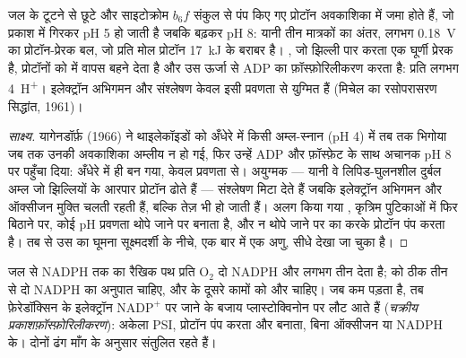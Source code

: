 \begin{theorem}\label{thm:b1:photosynthesis:chemiosmosis}
जल के टूटने से छूटे और साइटोक्रोम $b_6f$ संकुल से पंप किए गए प्रोटॉन
 अवकाशिका में जमा होते हैं, जो प्रकाश में गिरकर pH 5 हो जाती है
जबकि  बढ़कर pH 8: यानी तीन मात्रकों का अंतर, लगभग \qty{0.18}{V} का
प्रोटॉन-प्रेरक बल, जो प्रति मोल प्रोटॉन \qty{17}{kJ} के बराबर है।
\emph{}, जो  झिल्ली पार करता एक घूर्णी प्रेरक है,
प्रोटॉनों को  में वापस बहने देता है और उस ऊर्जा से ADP का
फ़ॉस्फ़ोरिलीकरण करता है: प्रति  लगभग \qty{4}{H^+}। इलेक्ट्रॉन अभिगमन
और  संश्लेषण केवल इसी प्रवणता से युग्मित हैं (मिचेल का रसोपरासरण
सिद्धांत, 1961)।
\end{theorem}
\begin{proof}[साक्ष्य]
यागेनडॉर्फ़ (1966) ने थाइलेकॉइडों को अँधेरे में किसी अम्ल-स्नान (pH 4) में
तब तक भिगोया जब तक उनकी अवकाशिका अम्लीय न हो गई, फिर उन्हें ADP और
फ़ॉस्फ़ेट के साथ अचानक pH 8 पर पहुँचा दिया:  अँधेरे में ही बन गया, केवल
प्रवणता से। अयुग्मक --- यानी वे लिपिड-घुलनशील दुर्बल अम्ल जो झिल्लियों के
आरपार प्रोटॉन ढोते हैं ---  संश्लेषण मिटा देते हैं जबकि इलेक्ट्रॉन
अभिगमन और ऑक्सीजन मुक्ति चलती रहती हैं, बल्कि तेज़ भी हो जाती हैं। अलग
किया गया , कृत्रिम पुटिकाओं में फिर बिठाने पर, कोई pH प्रवणता
थोपे जाने पर  बनाता है, और न थोपे जाने पर  का  करके प्रोटॉन
पंप करता है। तब से उस  का घूमना सूक्ष्मदर्शी के नीचे, एक बार में एक
अणु, सीधे देखा जा चुका है।
\end{proof}

\begin{example}[चक्रीय और अचक्रीय प्रवाह]\label{ex:b1:photosynthesis:cyclic}
जल से NADPH तक का रैखिक पथ प्रति $\mathrm{O_2}$ दो
NADPH और लगभग तीन  देता है;  को ठीक तीन  से दो NADPH
का अनुपात चाहिए, और  के दूसरे कामों को और  चाहिए।
जब  कम पड़ता है, तब फ़ेरेडॉक्सिन के इलेक्ट्रॉन $\mathrm{NADP^+}$ पर
जाने के बजाय प्लास्टोक्विनोन पर लौट आते हैं (\emph{चक्रीय
प्रकाशफ़ॉस्फ़ोरिलीकरण}): अकेला PSI, प्रोटॉन पंप करता और  बनाता,
बिना ऑक्सीजन या NADPH के। दोनों ढंग माँग के अनुसार संतुलित रहते हैं।
\end{example}

